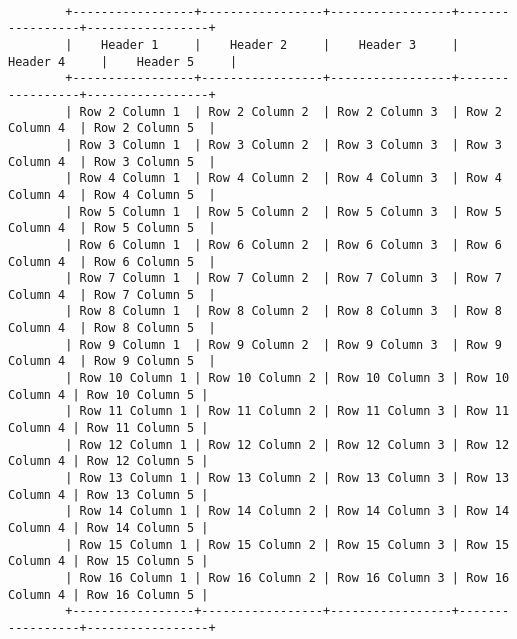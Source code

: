 \begin{mdframed}[rightline=false,leftline=false]
    \centering
    \begin{BVerbatim}[fontsize=\tiny]

        +-----------------+-----------------+-----------------+-----------------+-----------------+
        |    Header 1     |    Header 2     |    Header 3     |    Header 4     |    Header 5     |
        +-----------------+-----------------+-----------------+-----------------+-----------------+
        | Row 2 Column 1  | Row 2 Column 2  | Row 2 Column 3  | Row 2 Column 4  | Row 2 Column 5  |
        | Row 3 Column 1  | Row 3 Column 2  | Row 3 Column 3  | Row 3 Column 4  | Row 3 Column 5  |
        | Row 4 Column 1  | Row 4 Column 2  | Row 4 Column 3  | Row 4 Column 4  | Row 4 Column 5  |
        | Row 5 Column 1  | Row 5 Column 2  | Row 5 Column 3  | Row 5 Column 4  | Row 5 Column 5  |
        | Row 6 Column 1  | Row 6 Column 2  | Row 6 Column 3  | Row 6 Column 4  | Row 6 Column 5  |
        | Row 7 Column 1  | Row 7 Column 2  | Row 7 Column 3  | Row 7 Column 4  | Row 7 Column 5  |
        | Row 8 Column 1  | Row 8 Column 2  | Row 8 Column 3  | Row 8 Column 4  | Row 8 Column 5  |
        | Row 9 Column 1  | Row 9 Column 2  | Row 9 Column 3  | Row 9 Column 4  | Row 9 Column 5  |
        | Row 10 Column 1 | Row 10 Column 2 | Row 10 Column 3 | Row 10 Column 4 | Row 10 Column 5 |
        | Row 11 Column 1 | Row 11 Column 2 | Row 11 Column 3 | Row 11 Column 4 | Row 11 Column 5 |
        | Row 12 Column 1 | Row 12 Column 2 | Row 12 Column 3 | Row 12 Column 4 | Row 12 Column 5 |
        | Row 13 Column 1 | Row 13 Column 2 | Row 13 Column 3 | Row 13 Column 4 | Row 13 Column 5 |
        | Row 14 Column 1 | Row 14 Column 2 | Row 14 Column 3 | Row 14 Column 4 | Row 14 Column 5 |
        | Row 15 Column 1 | Row 15 Column 2 | Row 15 Column 3 | Row 15 Column 4 | Row 15 Column 5 |
        | Row 16 Column 1 | Row 16 Column 2 | Row 16 Column 3 | Row 16 Column 4 | Row 16 Column 5 |
        +-----------------+-----------------+-----------------+-----------------+-----------------+

    \end{BVerbatim}
\end{mdframed}


